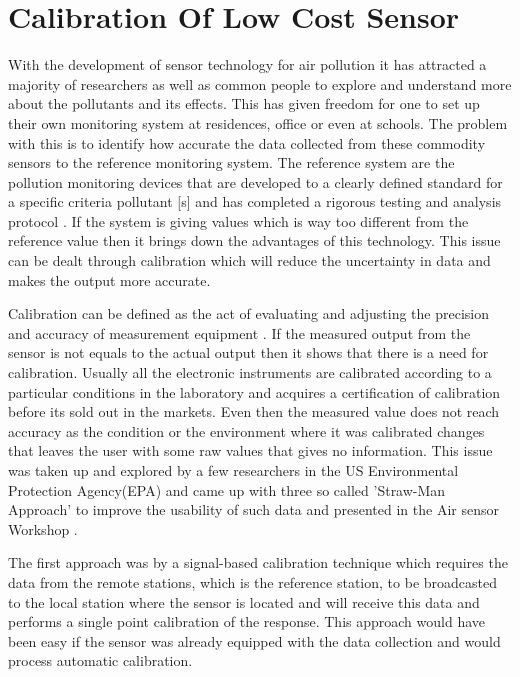 \documentclass[12pt,a4paper,oneside]{report}
\begin{document}
\section*{Calibration Of Low Cost Sensor}

With the development of sensor technology for air pollution it has attracted a majority of researchers as well as common people to explore and understand more about the pollutants and its effects. This has given freedom for one to set up their own monitoring system at residences, office or even at schools. The problem with this is to identify how accurate the data collected from these commodity sensors to the reference monitoring system. The reference system are the pollution monitoring devices that are developed to a clearly defined standard for a specific criteria pollutant [s] and has completed a rigorous testing and analysis protocol \cite{Hall2014}. If the system is giving values which is way too different from the reference value then it brings down the advantages of this technology. This issue can be dealt through calibration which will reduce the uncertainty in data and makes the output more accurate. 
\par 
Calibration can be defined as the act of evaluating and adjusting the precision and accuracy of measurement equipment \cite{Kejuruteraan2018}. If the measured output from the sensor is not equals to the actual output then it shows that there is a need for calibration. Usually all the electronic instruments are calibrated according to a particular conditions in the laboratory and acquires a certification of calibration before its sold out in the markets. Even then the measured value does not reach accuracy as the condition or the environment where it was calibrated changes that leaves the user with some raw values that gives no information. This issue was taken up and explored by a few researchers in the US Environmental Protection Agency(EPA) and came up with three so called 'Straw-Man Approach' to improve the usability of such data and presented in the Air sensor Workshop \cite{Williams2013}. 

The first approach was by a signal-based calibration technique which requires the data from the remote stations, which is the reference station, to be broadcasted to the local station where the sensor is located and will receive this data and performs a single point calibration of the response. This approach would have been easy if the sensor was already equipped with the data collection and would process automatic calibration. 
\end{document}
